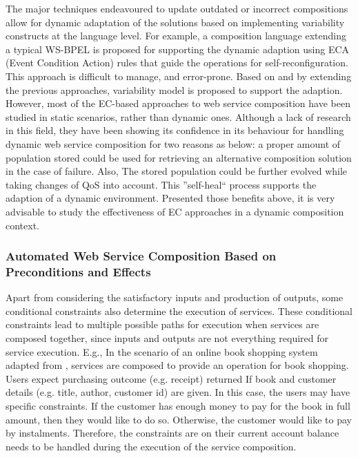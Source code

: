 The major techniques \cite{andrews2003business,baresi2011self,koning2009vxbpel} endeavoured to update outdated or incorrect compositions allow for dynamic adaptation of the solutions based on implementing variability constructs at the language level. For example, a composition language extending a typical WS-BPEL \cite{andrews2003business} is proposed for supporting the dynamic adaption using ECA (Event Condition Action) rules that guide the operations for self-reconfiguration. This approach is difficult to manage, and error-prone. Based on and by extending the previous approaches, variability model \cite{alferez2014dynamic} is proposed to support the adaption. However, most of the EC-based approaches to web service composition have been studied in static scenarios, rather than dynamic ones. Although a lack of research in this field, they have been showing its confidence in its behaviour for handling dynamic web service composition for two reasons as below: a proper amount of population stored could be used for retrieving an alternative composition solution in the case of failure. Also, The stored population could be further evolved while taking changes of QoS into account. This ''self-heal`` process supports the adaption of a dynamic environment. Presented those benefits above, it is very advisable to study the effectiveness of EC approaches in a dynamic composition context.


\subsubsection{Automated Web Service Composition Based on Preconditions and Effects}
Apart from considering the satisfactory inputs and production of outputs, some conditional constraints also determine the execution of services.  These conditional constraints lead to multiple possible paths for execution when services are composed together, since inputs and outputs are not everything required for service execution. E.g., In the scenario of an online book shopping system adapted from \cite{wang2014automated}, services are composed to provide an operation for book shopping.  Users expect purchasing outcome (e.g. receipt) returned If book and customer details (e.g. title, author, customer id) are given. In this case, the users may have specific constraints. If the customer has enough money to pay for the book in full amount, then they would like to do so. Otherwise, the customer would like to pay by instalments. Therefore, the constraints are on their current account balance needs to be handled during the execution of the service composition.

